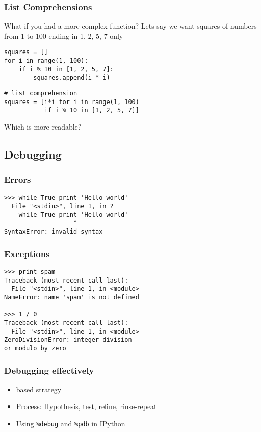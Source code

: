 \documentclass[14pt,compress]{beamer}
\newcounter{time}
\newcommand{\inctime}[1]{\addtocounter{time}{#1}{\tiny \thetime\ m}}
\newcommand{\typ}[1]{\texttt{#1}}
\newcommand{\kwrd}[1]{ \texttt{\textbf{\color{blue}{#1}}}  }
\begin{document}
\begin{frame}[fragile]
    \frametitle{List Comprehensions}
What if you had a more complex function?
Lets say we want squares of numbers from 1 to 100 ending in 1, 2, 5, 7 only
    \begin{lstlisting}
squares = []
for i in range(1, 100):
    if i % 10 in [1, 2, 5, 7]:
        squares.append(i * i)
    \end{lstlisting}
    \begin{lstlisting}
# list comprehension
squares = [i*i for i in range(1, 100)
           if i % 10 in [1, 2, 5, 7]]
     \end{lstlisting}
Which is more readable?
\inctime{15}
\end{frame}


\subsection{Debugging}
\begin{frame}[fragile]
 \frametitle{Errors}
 \begin{lstlisting}
>>> while True print 'Hello world'
  File "<stdin>", line 1, in ?
    while True print 'Hello world'
                   ^
SyntaxError: invalid syntax
\end{lstlisting}
\end{frame}

\begin{frame}[fragile]
 \frametitle{Exceptions}
 \begin{lstlisting}
>>> print spam
Traceback (most recent call last):
  File "<stdin>", line 1, in <module>
NameError: name 'spam' is not defined

>>> 1 / 0
Traceback (most recent call last):
  File "<stdin>", line 1, in <module>
ZeroDivisionError: integer division 
or modulo by zero
\end{lstlisting}
\end{frame}

\begin{frame}[fragile]
    \frametitle{Debugging effectively}

    \begin{itemize}
        \item  \kwrd{print} based strategy
        \item Process: Hypothesis, test, refine, rinse-repeat
        \item Using \typ{\%debug} and \typ{\%pdb} in IPython
    \end{itemize}
    \inctime{15} 
\end{frame}
\end{document}
